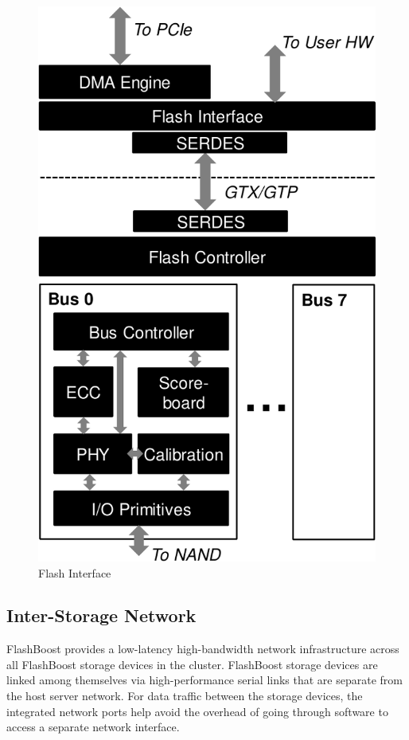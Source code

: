 \begin{figure}[h]
	\begin{center}
	\includegraphics[scale=0.4]{figures/top-arch-crop.pdf}
	\caption{Flash Interface}
	\label{fig:flashinterface}
	\end{center}
\end{figure}

\subsection{Inter-Storage Network}

FlashBoost provides a low-latency high-bandwidth network infrastructure across
all FlashBoost storage devices in the cluster.  FlashBoost storage devices are
linked among themselves via high-performance serial links that are separate from
the host server network. For data traffic between the storage devices, the
integrated network ports help avoid the overhead of going through software to
access a separate network interface.

